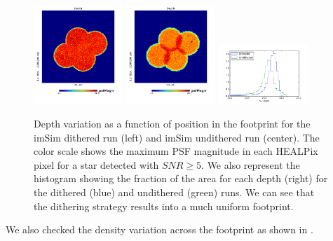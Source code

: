 \documentclass[\docopts]{\docclass}
\begin{document}
\begin{figure}
  \centering
  \includegraphics[width=0.3\textwidth]{depth_map_dithered}
  \includegraphics[width=0.3\textwidth]{depth_map_undithered}
  \includegraphics[width=0.3\textwidth]{5_sigma_depth_hist_imsim_dithered}
  \caption{Depth variation as a function of position in the footprint for the imSim dithered run (left) and imSim undithered run
  (center). The color scale shows the maximum PSF magnitude in each HEALPix pixel for a star detected with $SNR \geq 5$.
  We also represent the histogram showing the fraction of the area for each depth (right) for the dithered (blue) and
  undithered (green) runs. We can see that the dithering strategy results into a much uniform footprint.}
  \label{fig:depth_check_b}
\end{figure}

We also checked the density variation across the footprint as shown in .
\end{document}
